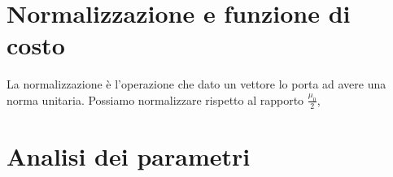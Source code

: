 \documentclass[a4paper, 11pt]{article}
\begin{document}
\section*{Normalizzazione e funzione di costo}

La normalizzazione è l'operazione che dato un vettore lo porta ad avere una
norma unitaria. Possiamo normalizzare rispetto al rapporto $\frac{\mu_{0}}{2}$,

\section*{Analisi dei parametri}



\begin{thebibliography}{9}
\end{thebibliography}
\end{document}
